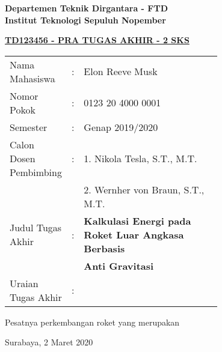 \begin{flushleft}
  \textbf{Departemen Teknik Dirgantara - FTD}\\
  \textbf{Institut Teknologi Sepuluh Nopember}\\
\end{flushleft}

\begin{center}
  \underline{\textbf{TD123456 - PRA TUGAS AKHIR - 2 SKS}}
\end{center}

\begin{adjustwidth}{-0.2cm}{}
  \begin{tabular}{lcp{0.7\linewidth}}

    Nama Mahasiswa &:& Elon Reeve Musk \\
    Nomor Pokok &:&	0123 20 4000 0001 \\

    Semester &:& Genap 2019/2020 \\

    Calon Dosen Pembimbing &:& 1. Nikola Tesla, S.T., M.T. \\
    & & 2. Wernher von Braun, S.T., M.T. \\

    Judul Tugas Akhir &:& \textbf{Kalkulasi Energi pada Roket Luar Angkasa Berbasis} \\
    & & \textbf{Anti Gravitasi} \\

    Uraian Tugas Akhir &:& \\
  \end{tabular}
\end{adjustwidth}

Pesatnya perkembangan roket yang merupakan \lipsum[1]
\vspace{1ex}

\begin{flushright}
  Surabaya, 2 Maret 2020
\end{flushright}
\vspace{1ex}

